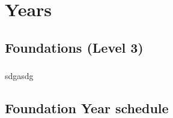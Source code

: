 \documentclass[
  11pt,
  letterpaper,
  oneside,
  open=any]{scrbook}
\begin{document}

\hypertarget{section-1}{%
\chapter{}\label{section-1}}

\part{Years}

\hypertarget{foundations-level-3}{%
\chapter{Foundations (Level 3)}\label{foundations-level-3}}

\hypertarget{section-2}{%
\section{}\label{section-2}}

sdgasdg

\hypertarget{foundation-year-schedule}{%
\chapter{Foundation Year schedule}\label{foundation-year-schedule}}
\end{document}
